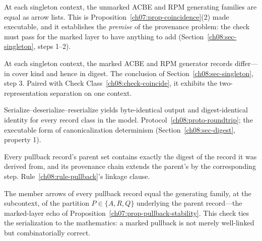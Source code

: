\begin{checkclass}\label{ch08:check-coincide}
At each singleton context, the unmarked ACBE and RPM generating families are equal as arrow lists. This is Proposition~\ref{ch07:prop-coincidence}(2) made executable, and it establishes the \emph{premise} of the provenance problem: the check must pass for the marked layer to have anything to add (Section~\ref{ch08:sec-singleton}, steps 1--2).
\end{checkclass}

\begin{checkclass}\label{ch08:check-distinct}
At each singleton context, the marked ACBE and RPM generator records differ---in cover kind and hence in digest. The conclusion of Section~\ref{ch08:sec-singleton}, step 3. Paired with Check Class~\ref{ch08:check-coincide}, it exhibits the two-representation separation on one context.
\end{checkclass}

\begin{checkclass}\label{ch08:check-roundtrip}
Serialize--deserialize--reserialize yields byte-identical output and digest-identical identity for every record class in the model. Protocol~\ref{ch08:proto-roundtrip}; the executable form of canonicalization determinism (Section~\ref{ch08:sec-digest}, property 1).
\end{checkclass}

\begin{checkclass}\label{ch08:check-bind}
Every pullback record's parent set contains exactly the digest of the record it was derived from, and its provenance chain extends the parent's by the corresponding step. Rule~\ref{ch08:rule-pullback}'s linkage clause.
\end{checkclass}

\begin{checkclass}\label{ch08:check-preserve}
The member arrows of every pullback record equal the generating family, at the subcontext, of the partition $P\in\{A,R,Q\}$ underlying the parent record---the marked-layer echo of Proposition~\ref{ch07:prop-pullback-stability}. This check ties the serialization to the mathematics: a marked pullback is not merely well-linked but combinatorially correct.
\end{checkclass}

